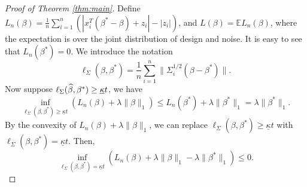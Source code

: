 \begin{proof}[Proof of Theorem \ref{thm:main}]
Define $L_n(\beta)=\frac{1}{n}\sum_{i=1}^n\left(|x_i^T(\beta^*-\beta)+z_i|-|z_i|\right)$, and $L(\beta)=\mathbb{E}L_n(\beta)$, where the expectation is over the joint distribution of design and noise. It is easy to see that $L_n(\beta^*)=0$. We introduce the notation
$$\ell_{\Sigma}(\beta,\beta^*)=\frac{1}{n}\sum_{i=1}^n\|\Sigma_i^{1/2}(\beta-\beta^*)\|.$$
Now suppose $\ell_{\Sigma}(\widehat{\beta},\beta^*)\geq \underline{\kappa}t$, we have
$$\inf_{\ell_{\Sigma}(\beta,\beta^*)\geq\underline{\kappa}t}(L_n(\beta)+\lambda\|\beta\|_1)\leq L_n(\beta^*)+\lambda\|\beta^*\|_1=\lambda\|\beta^*\|_1.$$
By the convexity of $L_n(\beta)+\lambda\|\beta\|_1$, we can replace $\ell_{\Sigma}(\beta,\beta^*)\geq\underline{\kappa}t$ with $\ell_{\Sigma}(\beta,\beta^*)=\underline{\kappa}t$. Then,
\begin{equation}
\inf_{\ell_{\Sigma}(\beta,\beta^*)=\underline{\kappa}t}(L_n(\beta)+\lambda\|\beta\|_1-\lambda\|\beta^*\|_1)\leq 0. \label{eq:basic}
\end{equation}


\end{proof}
